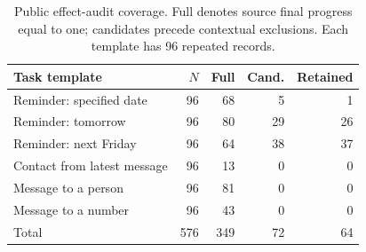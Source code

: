 \begin{table}[t]
\centering
\caption{Public effect-audit coverage. Full denotes source final progress equal to one; candidates precede contextual exclusions. Each template has 96 repeated records.}
\label{tab:tasks}
{\fontsize{9}{10.8}\selectfont
\setlength{\tabcolsep}{3pt}
\begin{tabular}{@{}lrrrr@{}}
\toprule
Task template & $N$ & Full & Cand. & Retained\\
\midrule
Reminder: specified date &96&68&5&1\\
Reminder: tomorrow &96&80&29&26\\
Reminder: next Friday &96&64&38&37\\
Contact from latest message &96&13&0&0\\
Message to a person &96&81&0&0\\
Message to a number &96&43&0&0\\
\midrule
Total &576&349&72&64\\
\bottomrule
\end{tabular}}
\end{table}
